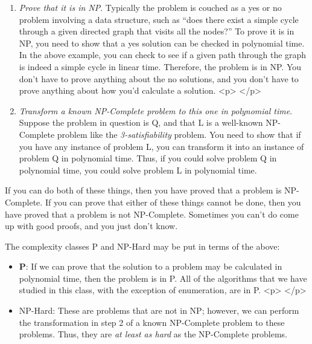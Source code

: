 \documentclass[12pt]{article}
\begin{document}
\begin{enumerate}
\item  \textit{Prove that it is in NP}.  Typically the problem is couched as
a {\scriptsize yes} or {\scriptsize no} problem involving a data structure, such 
as ``does there exist a simple cycle through a
given directed graph that visits all the nodes?''  
To prove it is in NP, you need to show that 
a {\scriptsize yes} solution can be checked in polynomial time.  
In the above example, you can check to see if a given path through the graph
is indeed a simple cycle in linear time.  Therefore, the problem is in 
{\scriptsize NP}.  You don't have to prove anything about the {\scriptsize no} solutions,
and you don't have to prove anything about how you'd calculate a solution.
<p>
</p>
\item  \textit{Transform a known NP-Complete problem to this one in polynomial time}.  
Suppose the problem in question is \textmd{Q},
and that \textmd{L} is a well-known NP-Complete problem like 
the \textit{3-satisfiability} problem.  You need to show that if you have
any instance of problem \textmd{L}, you can transform it into an instance
of problem \textmd{Q} in polynomial time.  Thus, if you could solve problem
\textmd{Q} in polynomial time, you could solve problem \textmd{L} in polynomial
time.

\end{enumerate}
If  you can do both of these things, then you have proved that a problem is
NP-Complete.  If you can prove that either of these things cannot be done, then you
have proved that a problem is not NP-Complete.  Sometimes you can't do come up
with good proofs, and you just don't know.  



The complexity classes P and NP-Hard may be put in terms of the above:


\begin{itemize}
\item  \textbf{P}: If we can prove that the solution to a problem may be calculated
in polynomial time, then the problem is in P.  All of the algorithms that we
have studied in this class, with the exception of enumeration, are in \textmd{P}.
<p>
</p>
\item  \textmd{NP-Hard}: These are problems that are not in NP; however, we can 
perform the transformation in step 2 of a known NP-Complete problem to these
problems.  Thus, they are \textit{at least as hard} as the NP-Complete problems.

\end{itemize}
\end{document}
